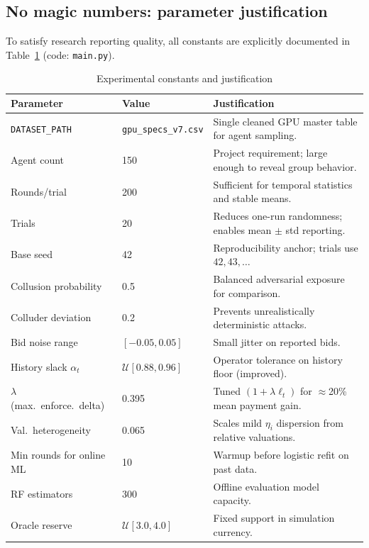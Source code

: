 \documentclass[journal]{IEEEtran}
\begin{document}
\subsection{No magic numbers: parameter justification}
To satisfy research reporting quality, all constants are explicitly documented in Table~\ref{tab:params} (code: \texttt{main.py}).
\begin{table}[t]
\centering
\caption{Experimental constants and justification}
\label{tab:params}
\begin{tabular}{p{} p{} p{}}
\toprule
\textbf{Parameter} & \textbf{Value} & \textbf{Justification} \\
\midrule
\texttt{DATASET\_PATH} & \texttt{gpu\_specs\_v7.csv} & Single cleaned GPU master table for agent sampling. \\
Agent count & 150 & Project requirement; large enough to reveal group behavior. \\
Rounds/trial & 200 & Sufficient for temporal statistics and stable means. \\
Trials & 20 & Reduces one-run randomness; enables mean $\pm$ std reporting. \\
Base seed & 42 & Reproducibility anchor; trials use $42,43,\ldots$ \\
Collusion probability & 0.5 & Balanced adversarial exposure for comparison. \\
Colluder deviation & 0.2 & Prevents unrealistically deterministic attacks. \\
Bid noise range & $[-0.05,0.05]$ & Small jitter on reported bids. \\
History slack $\alpha_t$ & $\mathcal{U}[0.88,0.96]$ & Operator tolerance on history floor (improved). \\
$\lambda$ (max.\ enforce.\ delta) & 0.395 & Tuned $(1+\lambda\ell_t)$ for $\approx$20\% mean payment gain. \\
Val.\ heterogeneity & 0.065 & Scales mild $\eta_i$ dispersion from relative valuations. \\
Min rounds for online ML & 10 & Warmup before logistic refit on past data. \\
RF estimators & 300 & Offline evaluation model capacity. \\
Oracle reserve & $\mathcal{U}[3.0,4.0]$ & Fixed support in simulation currency. \\
\bottomrule
\end{tabular}
\end{table}
\end{document}
